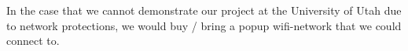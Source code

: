 \documentclass[conference]{IEEEtran}
\begin{document}
In the case that we cannot demonstrate our project at the University of Utah due to network protections,
we would buy / bring a popup wifi-network that we could connect to.
 

% 
% 

{}

\end{document}
